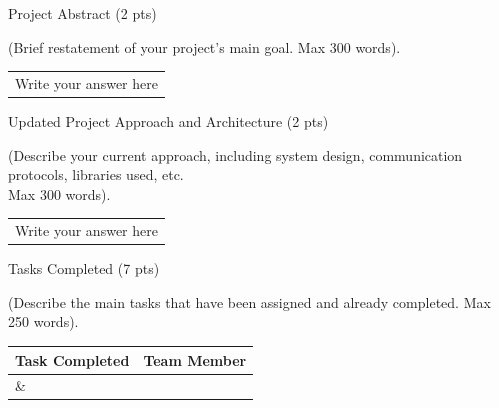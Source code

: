 \documentclass[12pt,a4paper]{article}
\newcommand{\sectiontitle}[1]{%
    {\color{GEUBlue}
    \fontsize{18}{22}\selectfont #1}
}
\newcommand{\instruction}[1]{%
    {\color{InstructionGrey}
    \fontsize{10.5}{13}\selectfont #1}
}
\newcommand{\answerbox}[2]{%
    \begin{tabularx}{\textwidth}{
        |>{\raggedright\arraybackslash}X|}
        \hline
        \parbox[t][#1][t]{\dimexpr\linewidth-12pt\relax}{
            \vspace{5pt}
            \fontsize{11}{13}\selectfont #2
        }\\
        \hline
    \end{tabularx}
}
\begin{document}
\vspace{0.70cm}

\sectiontitle{Project Abstract (2 pts)}

\vspace{0.05cm}

\instruction{
(Brief restatement of your project's main goal. Max 300 words).
}

\vspace{0.12cm}

\answerbox{3.60cm}{Write your answer here}

\vspace{0.70cm}

\sectiontitle{Updated Project Approach and Architecture (2 pts)}

\vspace{0.05cm}

\instruction{
(Describe your current approach, including system design,
communication protocols, libraries used, etc.\\
Max 300 words).
}

\vspace{0.25cm}

\answerbox{4.75cm}{Write your answer here}

\newpage


\vspace*{0.20cm}

\sectiontitle{Tasks Completed (7 pts)}

\vspace{0.05cm}

\instruction{
(Describe the main tasks that have been assigned and already completed.
Max 250 words).
}

\vspace{0.20cm}

\begin{tabularx}{\textwidth}{
|>{\raggedright\arraybackslash}X
|>{\raggedright\arraybackslash}X|
}
\hline
\textbf{Task Completed} &
\textbf{Team Member}\\
\hline

\parbox[t][3.25cm][t]{\linewidth}{}
&
\parbox[t][3.25cm][t]{\linewidth}{}
\\
\hline
\end{tabularx}

\vspace{0.65cm}
\end{document}
